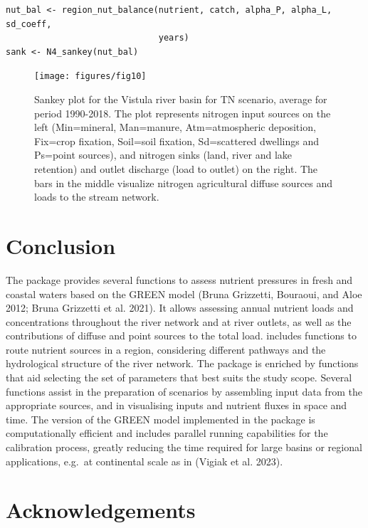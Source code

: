 \begin{verbatim}
nut_bal <- region_nut_balance(nutrient, catch, alpha_P, alpha_L, sd_coeff, 
                              years)
sank <- N4_sankey(nut_bal)
\end{verbatim}

\begin{figure}[H]
\texttt{[image: figures/fig10]} \caption{Sankey plot for the Vistula river basin for TN scenario, average for period 1990-2018. The plot represents nitrogen input sources on the left (Min=mineral, Man=manure, Atm=atmospheric deposition, Fix=crop fixation, Soil=soil fixation, Sd=scattered dwellings and Ps=point sources), and nitrogen sinks (land, river and lake retention) and outlet discharge (load to outlet) on the right. The bars in the middle visualize nitrogen agricultural diffuse sources and loads to the stream network.}\label{fig:sankey-vistula-river}
\end{figure}

\hypertarget{conclusion}{%
\section{Conclusion}\label{conclusion}}

The  package provides several functions to assess nutrient pressures in fresh and coastal waters based on the GREEN model (Bruna Grizzetti, Bouraoui, and Aloe 2012; Bruna Grizzetti et al. 2021). It allows assessing annual nutrient loads and concentrations throughout the river network and at river outlets, as well as the contributions of diffuse and point sources to the total load.  includes functions to route nutrient sources in a region, considering different pathways and the hydrological structure of the river network. The package is enriched by functions that aid selecting the set of parameters that best suits the study scope. Several functions assist in the preparation of scenarios by assembling input data from the appropriate sources, and in visualising inputs and nutrient fluxes in space and time. The version of the GREEN model implemented in the package is computationally efficient and includes parallel running capabilities for the calibration process, greatly reducing the time required for large basins or regional applications, e.g.~at continental scale as in (Vigiak et al. 2023).

\hypertarget{acknowledgements}{%
\section{Acknowledgements}\label{acknowledgements}}


